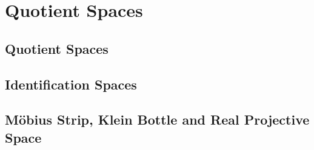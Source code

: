 \chapter{Quotient Spaces}

\section{Quotient Spaces}



\section{Identification Spaces}



\section{M\"{o}bius Strip, Klein Bottle and Real Projective Space}


